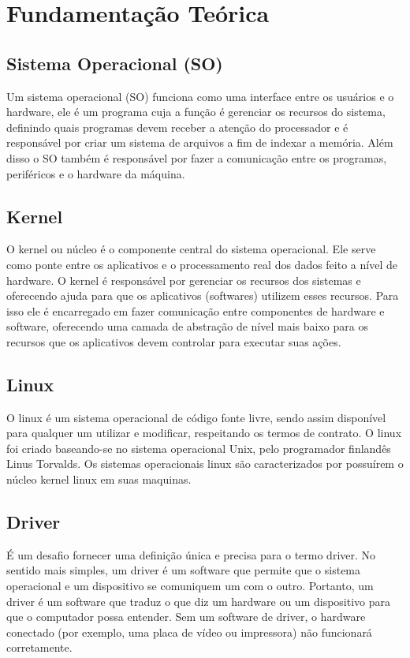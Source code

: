 \section{Fundamentação Teórica}

\subsection{Sistema Operacional (SO)}

Um sistema operacional (SO) funciona como uma interface entre os usuários e o hardware, ele é um programa cuja a função é gerenciar os recursos do sistema, definindo quais programas devem receber a atenção do processador e é responsável por criar um sistema de arquivos a fim de indexar a memória. Além disso o SO também é responsável por fazer a comunicação entre os programas, periféricos e o hardware da máquina. 

\subsection{Kernel}

O kernel ou núcleo é o componente central do sistema operacional. Ele serve como ponte entre os aplicativos e o processamento real dos dados feito a nível de hardware. O kernel é responsável por gerenciar os recursos dos sistemas e oferecendo ajuda para que os aplicativos (softwares) utilizem esses recursos. Para isso ele é encarregado em fazer comunicação entre componentes de hardware e software, oferecendo uma camada de abstração de nível mais baixo para os recursos que os aplicativos devem controlar para executar suas ações. 

\subsection{Linux}

O linux é um sistema operacional de código fonte livre, sendo assim disponível para qualquer um utilizar e modificar, respeitando os termos de contrato. O linux foi criado baseando-se no sistema operacional Unix, pelo programador finlandês Linus Torvalds. Os sistemas operacionais linux são caracterizados por possuírem o núcleo kernel linux em suas maquinas. 

\subsection{Driver}

 É um desafio fornecer uma definição única e precisa para o termo driver. No sentido mais simples, um driver é um software que permite que o sistema operacional e um dispositivo se comuniquem um com o outro. Portanto, um driver é um software que traduz o que diz um hardware ou um dispositivo para que o computador possa entender. Sem um software de driver, o hardware conectado (por exemplo, uma placa de vídeo ou impressora) não funcionará corretamente.

